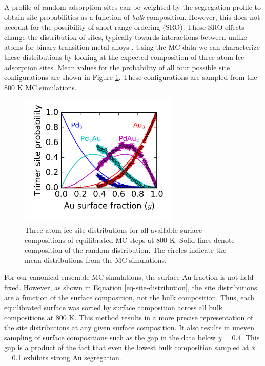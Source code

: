 \documentclass[12pt,oneside]{cmuthesis}
\begin{document}
A profile of random adsorption sites can be weighted by the segregation profile to obtain site probabilities as a function of \emph{bulk} composition. However, this does not account for the possibility of short-range ordering (SRO). These SRO effects change the distribution of sites, typically towards interactions between unlike atoms for binary transition metal alloys \cite{sadigh-1999-short-range,engstfeld-2012-format-atomic}. Using the MC data we can characterize these distributions by looking at the expected composition of three-atom fcc adsorption sites. Mean values for the probability of all four possible site configurations are shown in Figure \ref{fig-site-distribution}. These configurations are sampled from the 800 K MC simulations.

\begin{figure}[h]
\centering
\includegraphics[width=3in]{./images/site-distribution.png}
\caption{\label{fig-site-distribution}
Three-atom fcc site distributions for all available surface compositions of equilibrated MC steps at 800 K. Solid lines denote composition of the random distribution. The circles indicate the mean distributions from the MC simulations.}
\end{figure}

For our canonical ensemble MC simulations, the surface Au fraction is not held fixed. However, as shown in Equation \ref{eq-site-distribution}, the site distributions are a function of the surface composition, not the bulk composition. Thus, each equilibrated surface was sorted by surface composition across all bulk compositions at 800 K. This method results in a more precise representation of the site distributions at any given surface composition. It also results in uneven sampling of surface compositions such as the gap in the data below \(y\) = 0.4. This gap is a product of the fact that even the lowest bulk composition sampled at \(x\) = 0.1 exhibits strong Au segregation.
\end{document}
